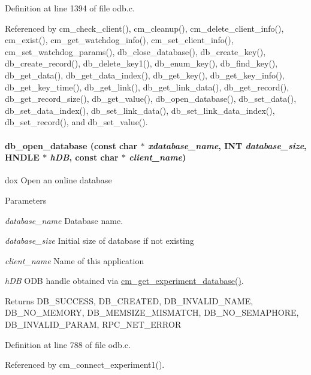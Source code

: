 Definition at line 1394 of file odb.c.

Referenced by cm\_\-check\_\-client(), cm\_\-cleanup(), cm\_\-delete\_\-client\_\-info(), cm\_\-exist(), cm\_\-get\_\-watchdog\_\-info(), cm\_\-set\_\-client\_\-info(), cm\_\-set\_\-watchdog\_\-params(), db\_\-close\_\-database(), db\_\-create\_\-key(), db\_\-create\_\-record(), db\_\-delete\_\-key1(), db\_\-enum\_\-key(), db\_\-find\_\-key(), db\_\-get\_\-data(), db\_\-get\_\-data\_\-index(), db\_\-get\_\-key(), db\_\-get\_\-key\_\-info(), db\_\-get\_\-key\_\-time(), db\_\-get\_\-link(), db\_\-get\_\-link\_\-data(), db\_\-get\_\-record(), db\_\-get\_\-record\_\-size(), db\_\-get\_\-value(), db\_\-open\_\-database(), db\_\-set\_\-data(), db\_\-set\_\-data\_\-index(), db\_\-set\_\-link\_\-data(), db\_\-set\_\-link\_\-data\_\-index(), db\_\-set\_\-record(), and db\_\-set\_\-value().
\paragraph[{db\_\-open\_\-database}]{ db\_\-open\_\-database (const char $\ast$ {\em xdatabase\_\-name}, \/  {\bf INT} {\em database\_\-size}, \/  HNDLE $\ast$ {\em hDB}, \/  const char $\ast$ {\em client\_\-name})}\hfill\label{group__odbfunctionc_gaece9851974b00231428f82b341e2c523}
dox Open an online database 
\begin{DoxyParams}{Parameters}
\item[{\em database\_\-name}]Database name. \item[{\em database\_\-size}]Initial size of database if not existing \item[{\em client\_\-name}]Name of this application \item[{\em hDB}]ODB handle obtained via \hyperlink{group__cmfunctionc_ga16b33b70783a3f5ba98b4094149d12b7}{cm\_\-get\_\-experiment\_\-database()}. \end{DoxyParams}
\begin{DoxyReturn}{Returns}
DB\_\-SUCCESS, DB\_\-CREATED, DB\_\-INVALID\_\-NAME, DB\_\-NO\_\-MEMORY, DB\_\-MEMSIZE\_\-MISMATCH, DB\_\-NO\_\-SEMAPHORE, DB\_\-INVALID\_\-PARAM, RPC\_\-NET\_\-ERROR 
\end{DoxyReturn}


Definition at line 788 of file odb.c.

Referenced by cm\_\-connect\_\-experiment1().
